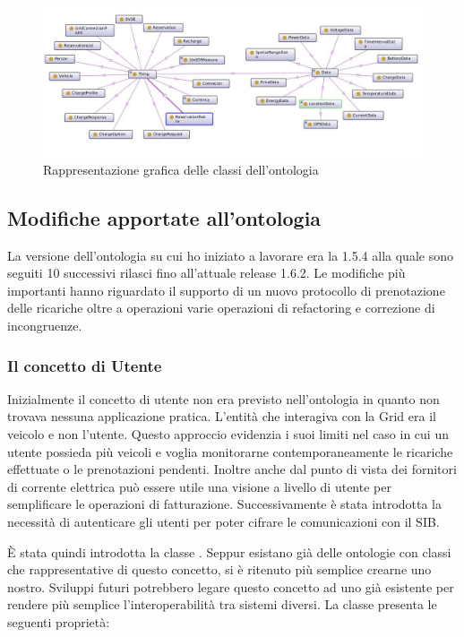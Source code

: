 \begin{figure}[H]
	\centering
	\includegraphics[width=1.0\textwidth]{assets/ontology-pro.jpg}
	\caption{Rappresentazione grafica delle classi dell'ontologia}
	\label{fig:ioe-ontology}
\end{figure}

\subsection{Modifiche apportate all'ontologia}

La versione dell'ontologia su cui ho iniziato a lavorare era la 1.5.4 alla quale sono seguiti 10 successivi rilasci fino all'attuale release 1.6.2. Le modifiche più importanti hanno riguardato il supporto di un nuovo protocollo di prenotazione delle ricariche oltre a operazioni varie operazioni di refactoring e correzione di incongruenze.

\subsubsection{Il concetto di Utente}\label{subsubsec:person}

Inizialmente il concetto di utente non era previsto nell'ontologia in quanto non trovava nessuna applicazione pratica.
L'entità che interagiva con la Grid era il veicolo e non l'utente. Questo approccio evidenzia i suoi limiti nel caso in cui un utente possieda più veicoli e voglia monitorarne contemporaneamente le ricariche effettuate o le prenotazioni pendenti. Inoltre anche dal punto di vista dei fornitori di corrente elettrica può essere utile una visione a livello di utente per semplificare le operazioni di fatturazione. Successivamente è stata introdotta la necessità di autenticare gli utenti per poter cifrare le comunicazioni con il SIB. 

È stata quindi introdotta la classe . Seppur esistano già delle ontologie con classi che rappresentative di questo concetto, si è ritenuto più semplice crearne uno nostro. Sviluppi futuri potrebbero legare questo concetto ad uno già esistente per rendere più semplice l'interoperabilità tra sistemi diversi. La classe presenta le seguenti proprietà:


